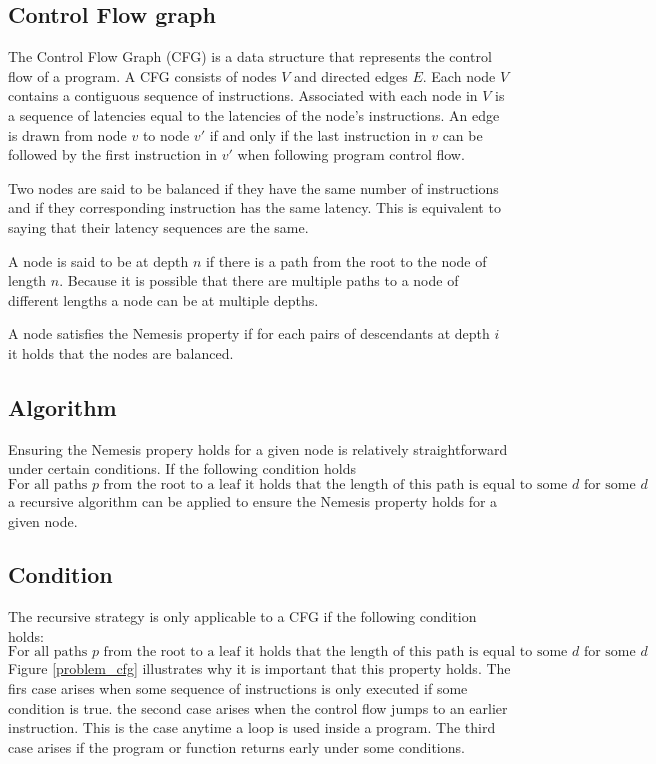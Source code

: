 \documentclass{article}
\begin{document}

\subsection{Control Flow graph}
The Control Flow Graph (CFG) is a data structure that represents the control flow of a program. A CFG consists of nodes $V$ and directed edges $E$. Each node $V$ contains a contiguous sequence of instructions. Associated with each node 
in $V$ is a sequence of latencies equal to the latencies of the node's instructions. An edge is drawn from node $v$ to node $v'$ if and only if the last instruction in $v$ can be followed by the first instruction in $v'$ when following 
program control flow. 

Two nodes are said to be balanced if they have the same number of instructions and if they corresponding instruction has the same latency. This is equivalent to saying that their latency sequences are the same. 

A node is said to be at depth $n$ if there is a path from the root to the node of length $n$. Because it is possible that there are multiple paths to a node of different lengths a node can be at multiple depths. 

A node satisfies the Nemesis property if for each pairs of descendants at depth $i$ it holds that the nodes are balanced.  

\subsection{Algorithm}
Ensuring the Nemesis propery holds for a given node is relatively straightforward under certain conditions. If the following condition holds 
	$$\text{For all paths $p$ from the root to a leaf it holds that the length of this path is equal to some $d$ for some $d$}$$
a recursive algorithm can be applied to ensure the Nemesis property holds for a given node. 



\subsection{Condition}
The recursive strategy is only applicable to a CFG if the following condition holds: 
	$$\text{For all paths $p$ from the root to a leaf it holds that the length of this path is equal to some $d$ for some $d$}$$
Figure \ref{problem_cfg} illustrates why it is important that this property holds.  The firs case arises when some sequence of instructions 
is only executed if some condition is true. the second case arises when the control flow jumps to an earlier instruction. This is the case anytime a loop is used inside a program. 
The third case arises if the program or function returns early under some conditions. 
\end{document}

